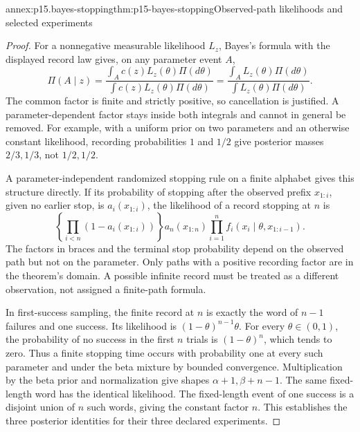 \begin{annexitem}{annex:p15.bayes-stopping}{thm:p15-bayes-stopping}{Observed-path likelihoods and selected experiments}
\begin{proof}
For a nonnegative measurable likelihood \(L_z\), Bayes's
formula with the displayed record law gives, on any
parameter event \(A\),
\[
 \Pi(A\mid z)=
 \frac{\int_A c(z)L_z(\theta)\Pi(d\theta)}
      {\int c(z)L_z(\theta)\Pi(d\theta)}
 =\frac{\int_A L_z(\theta)\Pi(d\theta)}
      {\int L_z(\theta)\Pi(d\theta)}.
\]
The common factor is finite and strictly positive,
so cancellation is justified. A parameter-dependent
factor stays inside both integrals and cannot in
general be removed. For example, with a uniform
prior on two parameters and an otherwise constant
likelihood, recording probabilities \(1\) and \(1/2\)
give posterior masses \(2/3,1/3\), not \(1/2,1/2\).

A parameter-independent randomized stopping rule on
a finite alphabet gives this structure directly.
If its probability of stopping after the observed
prefix \(x_{1:i}\), given no earlier stop, is
\(a_i(x_{1:i})\), the likelihood of a record stopping
at \(n\) is
\[
 \left\{\prod_{i<n}(1-a_i(x_{1:i}))\right\}
       a_n(x_{1:n})\prod_{i=1}^n
                   f_i(x_i\mid\theta,x_{1:i-1}).
\]
The factors in braces and the terminal stop probability
depend on the observed path but not on the parameter.
Only paths with a positive recording factor are in
the theorem's domain. A possible infinite record must
be treated as a different observation, not assigned
a finite-path formula.

In first-success sampling, the finite record at \(n\)
is exactly the word of \(n-1\) failures and one success.
Its likelihood is \((1-\theta)^{n-1}\theta\).
For every \(\theta\in(0,1)\), the probability of
no success in the first \(n\) trials is \((1-\theta)^n\),
which tends to zero. Thus a finite stopping time occurs
with probability one at every such parameter and
under the beta mixture by bounded convergence.
Multiplication by the beta prior and normalization
give shapes \(\alpha+1,\beta+n-1\).
The same fixed-length word has the identical likelihood.
The fixed-length event of one success is a disjoint
union of \(n\) such words, giving the constant factor \(n\).
This establishes the three posterior identities for
their three declared experiments.


\end{proof}
\end{annexitem}

